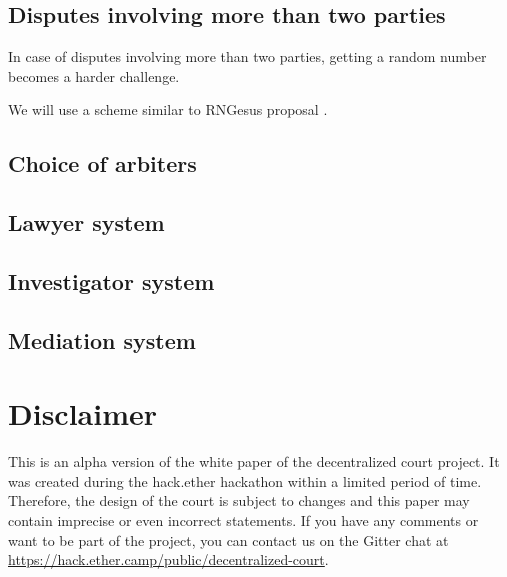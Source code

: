 \documentclass[12 pt]{article}
\begin{document}
\subsection{Disputes involving more than two parties}

In case of disputes involving more than two parties, getting a random number becomes a harder challenge.

We will use a scheme similar to RNGesus proposal \cite{rngsus}.

\subsection{Choice of arbiters}

\subsection{Lawyer system}

\subsection{Investigator system}

\subsection{Mediation system}

\section{Disclaimer}
This is an alpha version of the white paper of the decentralized court project. It was created during the hack.ether hackathon within a limited period of time. Therefore, the design of the court is subject to changes and this paper may contain imprecise or even incorrect statements. If you have any comments or want to be part of the project, you can contact us on the Gitter chat at \url{https://hack.ether.camp/public/decentralized-court}.





\nocite{*}
{}

\end{document}
